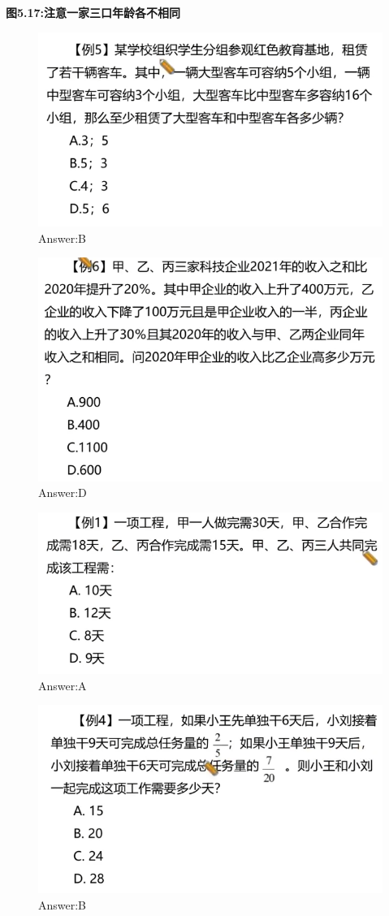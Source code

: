 \documentclass{article}
\numberwithin{equation}{section}						%
\numberwithin{figure}{section}							%
\begin{document}
\begin{sloppypar}
\textbf{图5.17:注意一家三口年龄各不相同}

\begin{figure}[H]
     \centering
     \includegraphics[width=0.6\linewidth]{258.png}
		\caption{Answer:B}
\end{figure}

\begin{figure}[H]
     \centering
     \includegraphics[width=0.6\linewidth]{259.png}
		\caption{Answer:D}
\end{figure}


\begin{figure}[H]
     \centering
     \includegraphics[width=0.6\linewidth]{260.png}
		\caption{Answer:A}
\end{figure}



\begin{figure}[H]
     \centering
     \includegraphics[width=0.6\linewidth]{261.png}
		\caption{Answer:B}
\end{figure}




\end{sloppypar}
\end{document}
